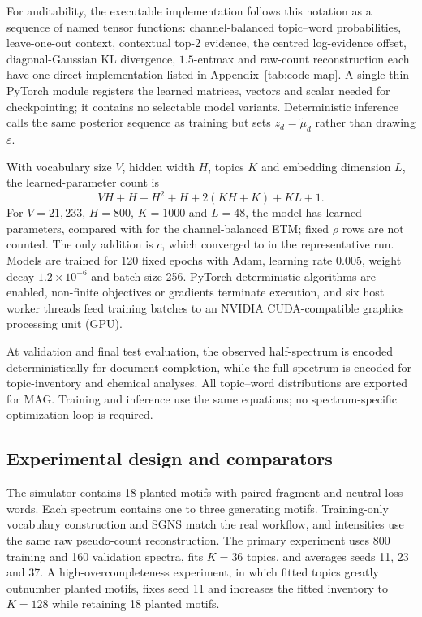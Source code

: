 \documentclass[10pt,a4paper]{article}
\begin{document}
For auditability, the executable implementation follows this notation as a
sequence of named tensor functions: channel-balanced topic--word probabilities,
leave-one-out context, contextual top-2 evidence, the centred log-evidence
offset, diagonal-Gaussian KL divergence, $1.5$-entmax and raw-count
reconstruction each have one direct implementation listed in
Appendix~\ref{tab:code-map}. A single thin PyTorch
module registers the learned matrices, vectors and scalar needed for
checkpointing; it contains no selectable model variants. Deterministic
inference calls the same posterior sequence as training but sets
$z_d=\widetilde\mu_d$ rather than drawing $\varepsilon$.

With vocabulary size $V$, hidden width $H$, topics $K$ and embedding dimension
$L$, the learned-parameter count is
\[
  VH+H+H^2+H+2(KH+K)+KL+1.
\]
For $V=21{,}233$, $H=800$, $K=1000$ and $L=48$, the model has
\ContextualParameters{} learned parameters, compared with \BaseParameters{}
for the channel-balanced ETM; fixed $\rho$ rows are not counted. The only
addition is $c$, which converged to \LearnedContextScale{} in the representative
run. Models are
trained for 120 fixed epochs with Adam, learning rate $0.005$, weight decay
$1.2\times10^{-6}$ and batch size 256. PyTorch deterministic algorithms are
enabled, non-finite objectives or gradients terminate execution, and six
host worker threads feed training batches to an NVIDIA CUDA-compatible
graphics processing unit (GPU).

At validation and final test evaluation, the observed half-spectrum is encoded
deterministically for document completion, while the full spectrum is encoded
for topic-inventory and chemical analyses. All \StudyTopics{} topic--word
distributions are exported for MAG. Training and inference use the same
equations; no spectrum-specific optimization loop is required.

\subsection{Experimental design and comparators}

The simulator contains 18 planted motifs with paired fragment and neutral-loss
words. Each spectrum contains one to three generating motifs. Training-only
vocabulary construction and SGNS match the real workflow, and intensities use
the same raw pseudo-count reconstruction. The primary experiment uses 800
training and 160 validation spectra, fits $K=36$ topics, and averages seeds 11,
23 and 37. A high-overcompleteness experiment, in which fitted topics greatly
outnumber planted motifs, fixes seed 11 and increases the fitted inventory to
$K=128$ while retaining 18 planted motifs.
\end{document}
